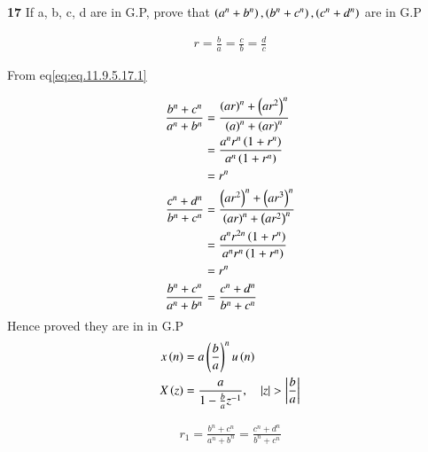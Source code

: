 \documentclass[journal,12pt,twocolumn]{IEEEtran}
\theoremstyle{remark}
\begin{document}


\vspace{3cm}

\title{}
\author{EE23BTECH11047 - Deepakreddy P
}
\maketitle
\newpage
\bigskip

\noindent \textbf{17} \quad 
If a, b, c, d are in G.P, prove that 
$ \left(a^{n} + b^{n}\right),\left(b^{n} + c^{n}\right),\left(c^{n} + d^{n}\right) $ are in G.P \\
\solution

\begin{center}
    \begin{table}[ht]
        
    \end{table}
\end{center}

\begin{align}   
r=\frac{b}{a} = \frac{c}{b}= \frac{d}{c} \label{eq:eq.11.9.5.17.1}
\end{align}

From eq\eqref{eq:eq.11.9.5.17.1}

\begin{align}
\frac{b^n + c^n}{a^n + b^n}
&= \frac{\left(ar\right)^n + \left(ar^2\right)^n}{\left(a\right)^n + \left(ar\right)^n}\\
&= \frac{a^n r^n \left(1+ r^n\right)}{a^n \left(1 + r^n\right)}\\
&= r^n \\
\frac{c^n + d^n}{b^n + c^n}&= \frac{\left(ar^2\right)^n + \left(ar^3\right)^n}{\left(ar\right)^n + \left(ar^2\right)^n}\\
&= \frac{a^n r^{2n} \left(1 + r^n\right)}{a^n r^n \left(1 + r^n\right)}\\
&= r^n \\
\frac{b^n + c^n}{a^n + b^n} &= \frac{c^n + d^n}{b^n + c^n}
\end{align}
Hence proved they are in in G.P\\

\begin{align}
    x\left(n\right) &= a\left(\frac{b}{a}\right)^{n} u\left(n\right)\\
    X\left(z\right) &= \frac{a}{1-\frac{b}{a} z^{-1}}, \quad \left\vert z\right\vert>\left\vert\frac{b}{a}\right\vert
\end{align}

\begin{align}   
r_1=\frac{b^n + c^n}{a^n + b^n} = \frac{c^n + d^n}{b^n + c^n} \label{eq:eq.11.9.5.17.2}
\end{align}
\end{document}
